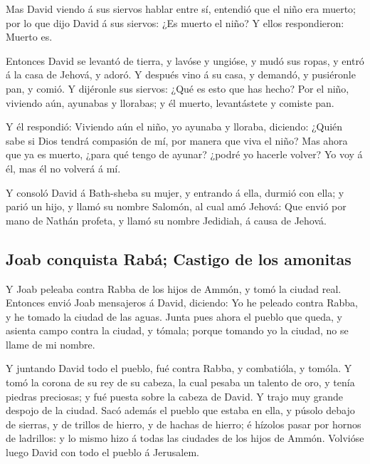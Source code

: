  Mas David viendo á sus siervos hablar entre sí, entendió
que el niño era muerto; por lo que dijo David á sus siervos: ¿Es muerto
el niño? Y ellos respondieron: Muerto es.

 Entonces David se levantó de tierra, y lavóse y ungióse, y
mudó sus ropas, y entró á la casa de Jehová, y adoró. Y después vino á
su casa, y demandó, y pusiéronle pan, y comió.  Y dijéronle
sus siervos: ¿Qué es esto que has hecho? Por el niño, viviendo aún,
ayunabas y llorabas; y él muerto, levantástete y comiste pan.

 Y él respondió: Viviendo aún el niño, yo ayunaba y
lloraba, diciendo: ¿Quién sabe si Dios tendrá compasión de mí, por
manera que viva el niño?  Mas ahora que ya es muerto, ¿para
qué tengo de ayunar? ¿podré yo hacerle volver? Yo voy á él, mas él no
volverá á mí.

 Y consoló David á Bath-sheba su mujer, y entrando á ella,
durmió con ella; y parió un hijo, y llamó su nombre Salomón, al cual amó
Jehová:  Que envió por mano de Nathán profeta, y llamó su
nombre Jedidiah, á causa de Jehová.

\hypertarget{joab-conquista-rabuxe1-castigo-de-los-amonitas}{%
\subsection{Joab conquista Rabá; Castigo de los
amonitas}\label{joab-conquista-rabuxe1-castigo-de-los-amonitas}}

 Y Joab peleaba contra Rabba de los hijos de Ammón, y tomó
la ciudad real.  Entonces envió Joab mensajeros á David,
diciendo: Yo he peleado contra Rabba, y he tomado la ciudad de las
aguas.  Junta pues ahora el pueblo que queda, y asienta
campo contra la ciudad, y tómala; porque tomando yo la ciudad, no se
llame de mi nombre.

 Y juntando David todo el pueblo, fué contra Rabba, y
combatióla, y tomóla.  Y tomó la corona de su rey de su
cabeza, la cual pesaba un talento de oro, y tenía piedras preciosas; y
fué puesta sobre la cabeza de David. Y trajo muy grande despojo de la
ciudad.  Sacó además el pueblo que estaba en ella, y púsolo
debajo de sierras, y de trillos de hierro, y de hachas de hierro; é
hízolos pasar por hornos de ladrillos: y lo mismo hizo á todas las
ciudades de los hijos de Ammón. Volvióse luego David con todo el pueblo
á Jerusalem.

